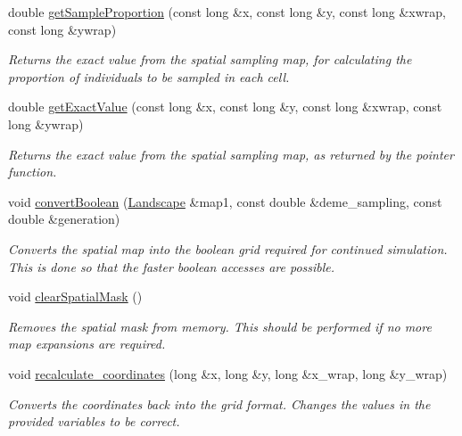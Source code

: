 \begin{DoxyCompactItemize}
double \hyperlink{class_data_mask_a682324892b67910b1dd2fa86a98c0873}{get\+Sample\+Proportion} (const long \&x, const long \&y, const long \&xwrap, const long \&ywrap)
\begin{DoxyCompactList}\small\item\em Returns the exact value from the spatial sampling map, for calculating the proportion of individuals to be sampled in each cell. \end{DoxyCompactList}\item 
double \hyperlink{class_data_mask_a2738d996bf7ee99d44a2833b2bed15ef}{get\+Exact\+Value} (const long \&x, const long \&y, const long \&xwrap, const long \&ywrap)
\begin{DoxyCompactList}\small\item\em Returns the exact value from the spatial sampling map, as returned by the pointer function. \end{DoxyCompactList}\item 
void \hyperlink{class_data_mask_a881c2393b1506d5dd026750405613bdd}{convert\+Boolean} (\hyperlink{class_landscape}{Landscape} \&map1, const double \&deme\+\_\+sampling, const double \&generation)
\begin{DoxyCompactList}\small\item\em Converts the spatial map into the boolean grid required for continued simulation. This is done so that the faster boolean accesses are possible. \end{DoxyCompactList}\item 
void \hyperlink{class_data_mask_a2d152bcb13820a9061ea85c984e042a7}{clear\+Spatial\+Mask} ()\hypertarget{class_data_mask_a2d152bcb13820a9061ea85c984e042a7}{}\label{class_data_mask_a2d152bcb13820a9061ea85c984e042a7}

\begin{DoxyCompactList}\small\item\em Removes the spatial mask from memory. This should be performed if no more map expansions are required. \end{DoxyCompactList}\item 
void \hyperlink{class_data_mask_ab96af629241f61a4d7122c6b7a91a3ef}{recalculate\+\_\+coordinates} (long \&x, long \&y, long \&x\+\_\+wrap, long \&y\+\_\+wrap)
\begin{DoxyCompactList}\small\item\em Converts the coordinates back into the grid format. Changes the values in the provided variables to be correct. \end{DoxyCompactList}\end{DoxyCompactItemize}
